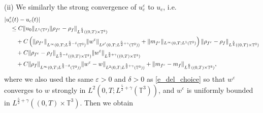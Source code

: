 \documentclass[10pt,reqno]{amsart}
\numberwithin{equation}{section}
\newcommand{\T}{\mathbb T}
\newcommand{\e}{\varepsilon}
\newcommand{\lt}{\left}
\newcommand{\rt}{\right}
\begin{document}
\noindent (ii) We similarly the strong convergence of $u_c^\e$ to $u_c$, i.e. 
\[
\begin{aligned}
&|u_c^\e(t) - u_c(t)| \cr
&\quad \le  C \|u_0\|_{L^1(\T^3)}\|\rho_{f^\e} - \rho_f\|_{L^{\frac 54}((0,T)\times\T^3)}\\
&\qquad + C\lt(\|\rho_{f^\e}\|_{L^\infty(0,T;L^{\frac 53 -\delta}(\T^3)}\|w^\e\|_{L^{p'}(0,T;L^{\frac 52 +\gamma}(\T^3))} + \|m_{f^\e}\|_{L^\infty(0,T;L^1(\T^3)}\rt)\|\rho_{f^\e} - \rho_f\|_{L^{\frac 54}((0,T)\times\T^3)}\\
&\qquad+ C\|\rho_{f^\e} - \rho_f\|_{L^{\frac 53-\delta}((0,T)\times\T^3)} \|w^\e\|_{L^{\frac 52 +\gamma}((0,T)\times\T^3)}\\
&\qquad + C\|\rho_f \|_{L^\infty(0,T;L^{\frac 53-\delta}(\T^3))} \|w^\e - w\|_{L^2(0,T;L^{\frac 52+\gamma}(\T^3))} + \|m_{f^\e} - m_f\|_{L^{\frac 65}((0,T)\times\T^3)},
\end{aligned}
\]
where we also used the same $\e>0$ and $\delta>0$ as \eqref{e_del_choice}  so that $w^\e$ converges to $w$ strongly in $L^2(0,T;L^{\frac 52+\gamma}(\T^3))$, and $w^\e$ is uniformly bounded in $L^{\frac 52 + \gamma}((0,T)\times\T^3)$. Then we obtain
\end{document}
